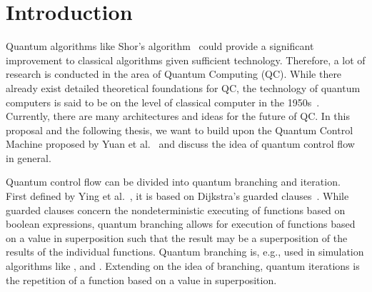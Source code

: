\chapter{Introduction}

Quantum algorithms like Shor's algorithm~\cite{Shor97} could provide a significant improvement to classical algorithms given sufficient technology.  Therefore, a lot of research is conducted in the area of Quantum Computing (QC). While there already exist detailed theoretical foundations for QC, the technology of quantum computers is said to be on the level of classical computer in the 1950s~\cite{CFM17}. Currently, there are many architectures and ideas for the future of QC. In this proposal and the following thesis, we want to build upon the Quantum Control Machine proposed by Yuan et al.~\cite{YVC24} and discuss the idea of quantum control flow in general.

Quantum control flow can be divided into quantum branching and iteration.~\cite{YVC24} First defined by Ying et al.~\cite{YYF12}, it is based on Dijkstra's guarded clauses~\cite{Dijk75}. While guarded clauses concern the nondeterministic executing of functions based on boolean expressions, quantum branching allows for execution of functions based on a value in superposition such that the result may be a superposition of the results of the individual functions. Quantum branching is, e.g., used in simulation algorithms like \cite{BGB*18}, and \cite{LoCh19}. Extending on the idea of branching, quantum iterations is the repetition of a function based on a value in superposition. 

